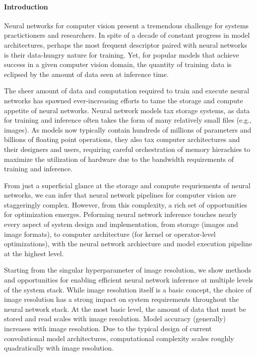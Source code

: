 \paragraph{Introduction}
Neural networks for computer vision present a tremendous challenge for systems practictioners and researchers.
In spite of a decade of constant progress in model architectures, perhaps the most frequent descriptor paired with neural networks is their data-hungry nature for training.
Yet, for popular models that achieve success in a given computer vision domain, the quantity of training data is eclipsed by the amount of data seen at inference time.

The sheer amount of data and computation required to train and execute neural networks has spawned ever-increasing efforts to tame the storage and compute appetite of neural networks.
Neural network models tax storage systems, as data for training and inference often takes the form of many relatively small files (e.g., images).
As models now typically contain hundreds of millions of parameters and billions of floating point operations, they also tax computer architectures and their designers and users, requiring careful orchestration of memory hierachies to maximize the utilization of hardware due to the bandwidth requirements of training and inference.

From just a superficial glance at the storage and compute requriements of neural networks, we can infer that neural network pipelines for computer vision are staggeringly complex.
However, from this complexity, a rich set of opportunities for optimization emerges.
Peforming neural network inference touches nearly every aspect of system design and implementation, from storage (images and image formats), to computer architecture (for kernel or operator-level optimizations), with the neural network archiecture and model execution pipeline at the highest level.

Starting from the singular hyperparameter of image resolution, we show methods and opportunities for enabling efficient neural network inference at multiple levels of the system stack.
While image resolution itself is a basic concept, the choice of image resolution has a strong impact on system requirements throughout the neural network stack.
At the most basic level, the amount of data that must be stored and read scales with image resolution.
Model accuracy (generally) increases with image resolution.
Due to the typical design of current convolutional model architectures, computational complexity scales roughly quadratically with image resolution.


